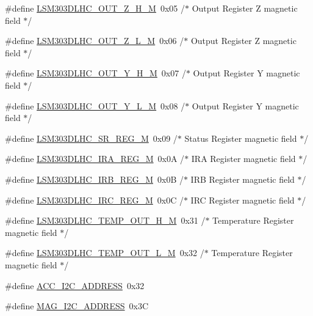 \begin{DoxyCompactItemize}
\#define \hyperlink{group__STM32F3__DISCOVERY__LSM303DLHC__Exported__Constants_gacdfdb9468218febd3bb857760be698b7}{L\+S\+M303\+D\+L\+H\+C\+\_\+\+O\+U\+T\+\_\+\+Z\+\_\+\+H\+\_\+\+M}~0x05  /$\ast$ Output Register Z magnetic field $\ast$/
\item 
\#define \hyperlink{group__STM32F3__DISCOVERY__LSM303DLHC__Exported__Constants_gaa825c24af0a81a1859d695c07650b24b}{L\+S\+M303\+D\+L\+H\+C\+\_\+\+O\+U\+T\+\_\+\+Z\+\_\+\+L\+\_\+\+M}~0x06  /$\ast$ Output Register Z magnetic field $\ast$/
\item 
\#define \hyperlink{group__STM32F3__DISCOVERY__LSM303DLHC__Exported__Constants_gad05a3a1a0944cfcb7ad6f0e7e774e9a7}{L\+S\+M303\+D\+L\+H\+C\+\_\+\+O\+U\+T\+\_\+\+Y\+\_\+\+H\+\_\+\+M}~0x07  /$\ast$ Output Register Y magnetic field $\ast$/
\item 
\#define \hyperlink{group__STM32F3__DISCOVERY__LSM303DLHC__Exported__Constants_ga829d5cf2ee6769f1881571a327cb689c}{L\+S\+M303\+D\+L\+H\+C\+\_\+\+O\+U\+T\+\_\+\+Y\+\_\+\+L\+\_\+\+M}~0x08  /$\ast$ Output Register Y magnetic field $\ast$/
\item 
\#define \hyperlink{group__STM32F3__DISCOVERY__LSM303DLHC__Exported__Constants_gaa7c5233922846b552837ae462f49dcc0}{L\+S\+M303\+D\+L\+H\+C\+\_\+\+S\+R\+\_\+\+R\+E\+G\+\_\+\+M}~0x09  /$\ast$ Status Register magnetic field $\ast$/
\item 
\#define \hyperlink{group__STM32F3__DISCOVERY__LSM303DLHC__Exported__Constants_ga0c8c505533e471f5590c3e22674bf9ce}{L\+S\+M303\+D\+L\+H\+C\+\_\+\+I\+R\+A\+\_\+\+R\+E\+G\+\_\+\+M}~0x0\+A  /$\ast$ I\+R\+A Register magnetic field $\ast$/
\item 
\#define \hyperlink{group__STM32F3__DISCOVERY__LSM303DLHC__Exported__Constants_gaf9ed78a3b9b9c9999d5062a8ffb515ce}{L\+S\+M303\+D\+L\+H\+C\+\_\+\+I\+R\+B\+\_\+\+R\+E\+G\+\_\+\+M}~0x0\+B  /$\ast$ I\+R\+B Register magnetic field $\ast$/
\item 
\#define \hyperlink{group__STM32F3__DISCOVERY__LSM303DLHC__Exported__Constants_gad09faf3ce76ed5f8807bbaecf9a28d5a}{L\+S\+M303\+D\+L\+H\+C\+\_\+\+I\+R\+C\+\_\+\+R\+E\+G\+\_\+\+M}~0x0\+C  /$\ast$ I\+R\+C Register magnetic field $\ast$/
\item 
\#define \hyperlink{group__STM32F3__DISCOVERY__LSM303DLHC__Exported__Constants_gafdb4ec18348f79461e95ff812e7aa633}{L\+S\+M303\+D\+L\+H\+C\+\_\+\+T\+E\+M\+P\+\_\+\+O\+U\+T\+\_\+\+H\+\_\+\+M}~0x31  /$\ast$ Temperature Register magnetic field $\ast$/
\item 
\#define \hyperlink{group__STM32F3__DISCOVERY__LSM303DLHC__Exported__Constants_gaaec9a809150fda72092c2de73912c225}{L\+S\+M303\+D\+L\+H\+C\+\_\+\+T\+E\+M\+P\+\_\+\+O\+U\+T\+\_\+\+L\+\_\+\+M}~0x32  /$\ast$ Temperature Register magnetic field $\ast$/
\item 
\#define \hyperlink{group__STM32F3__DISCOVERY__LSM303DLHC__Exported__Constants_ga633b5e8046dca2a598806e18d78d7db5}{A\+C\+C\+\_\+\+I2\+C\+\_\+\+A\+D\+D\+R\+E\+S\+S}~0x32
\item 
\#define \hyperlink{group__STM32F3__DISCOVERY__LSM303DLHC__Exported__Constants_ga9e6d7f104fae7d149acac4e8c252bc30}{M\+A\+G\+\_\+\+I2\+C\+\_\+\+A\+D\+D\+R\+E\+S\+S}~0x3\+C
\end{DoxyCompactItemize}



